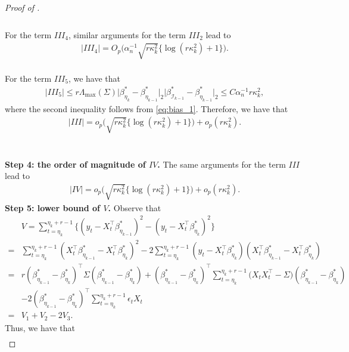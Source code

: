 \documentclass[11pt]{article}
\theoremstyle{plain}
\theoremstyle{definition}
\begin{document}
\begin{proof}[Proof of ]
\begin{align*}
\end{align*}
\
\\
For the term $III_4$, similar arguments for the term $III_2$ lead to
\begin{align*}
    |III_4| = O_p\big(\alpha_n^{-1}\sqrt{r\kappa_k^2}\{\log(r\kappa_k^2) + 1\}\big).
\end{align*}
\
\\
For the term $III_5$, we have that
\begin{align*}
    |III_5| \leq r\Lambda_{\max}(\Sigma)\big|\beta_{\eta_{k}}^* - \beta^*_{\eta_{k-1}}\big|_2\big|\beta^*_{\mathcal{I}_{k-1}} - \beta^*_{\eta_{k-1}}\big|_2 \leq C\alpha_n^{-1}r\kappa_k^2,
\end{align*}
where the second inequality follows from \eqref{eq:bias_1}.
Therefore, we have that
\begin{align}\label{eq:refine_noise3}
    |III| = o_p\big(\sqrt{r\kappa_k^2}\{\log(r\kappa_k^2) + 1\}\big) + o_p(r\kappa_k^2).
\end{align}
\\
\\
\textbf{Step 4: the order of magnitude of $IV$.} The same arguments for the term $III$ lead to
\begin{align}\label{eq:refine_noise4}
    |IV| = o_p\big(\sqrt{r\kappa_k^2}\{\log(r\kappa_k^2) + 1\}\big) + o_p(r\kappa_k^2).
\end{align}
\textbf{Step 5: lower bound of $V$.} Observe that
\begin{align*}
    &V = \sum_{t = \eta_k}^{\eta_k + r - 1} \big\{(y_t - X_t^{\top}\beta^*_{\eta_{k-1}})^2 - (y_t - X_t^{\top}\beta^*_{\eta_{k}})^2\big\}\\
    =& \sum_{t = \eta_k}^{\eta_k + r - 1} (X_t^{\top}\beta^*_{\eta_{k-1}} - X_t^{\top}\beta^*_{\eta_{k}})^2 - 2\sum_{t = \eta_k}^{\eta_k + r - 1}(y_t - X_t^{\top}\beta^*_{\eta_{k}})(X_t^{\top}\beta^*_{\eta_{k-1}} - X_t^{\top}\beta^*_{\eta_{k}})\\
    =& r(\beta^*_{\eta_{k-1}} - \beta^*_{\eta_{k}})^{\top}\Sigma(\beta^*_{\eta_{k-1}} - \beta^*_{\eta_{k}}) + (\beta^*_{\eta_{k-1}} - \beta^*_{\eta_{k}})^{\top}\sum_{t = \eta_k}^{\eta_k + r - 1}\big(X_tX_t^{\top} - \Sigma\big)(\beta^*_{\eta_{k-1}} - \beta^*_{\eta_{k}})\\
    &-2(\beta^*_{\eta_{k-1}} - \beta^*_{\eta_{k}})^{\top}\sum_{t = \eta_k}^{\eta_k + r - 1}\epsilon_tX_t\\
    =& V_1 + V_2 - 2V_3.
\end{align*}
Thus, we have that
\begin{align*}

\end{align*}
\end{proof}
\end{document}

